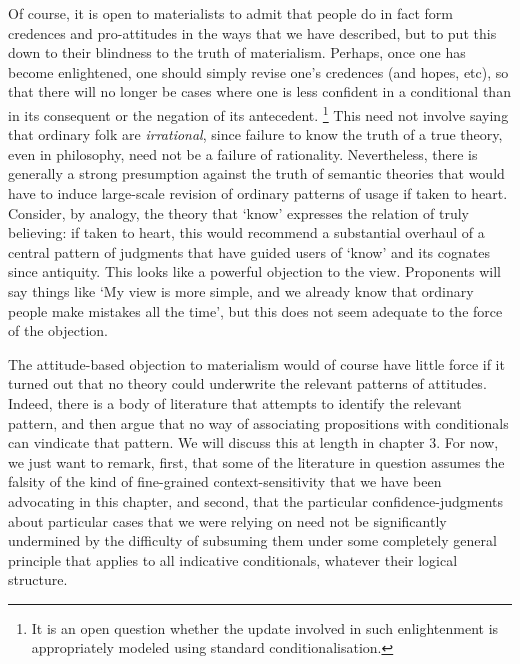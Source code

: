 \documentclass[If.tex]{subfiles}
\begin{document}
Of course, it is open to materialists to admit that people do in fact form credences and pro-attitudes in the ways that we have described, but to put this down to their blindness to the truth of materialism.  Perhaps, once one has become enlightened, one should simply revise one's credences (and hopes, etc), so that there will no longer be cases where one is less confident in a conditional than in its consequent or the negation of its antecedent.%
\footnote{It is an open question whether the update involved in such enlightenment is appropriately modeled using standard conditionalisation.}  
This need not involve saying that ordinary folk are \emph{irrational}, since failure to know the truth of a true theory, even in philosophy, need not be a failure of rationality.  Nevertheless, there is generally a strong presumption against the truth of semantic theories that would have to induce large-scale revision of ordinary patterns of usage if taken to heart.  Consider, by analogy, the theory that ‘know’ expresses the relation of truly believing: if taken to heart, this would recommend a substantial overhaul of a central pattern of judgments that have guided users of ‘know’ and its cognates since antiquity.  This looks like a powerful objection to the view.  Proponents will say things like ‘My view is more simple, and we already know that ordinary people make mistakes all the time’, but this does not seem adequate to the force of the objection.

The attitude-based objection to materialism would of course have little force if it turned out that no theory could underwrite the relevant patterns of attitudes. Indeed, there is a body of literature that attempts to identify the relevant pattern, and then argue that no way of associating propositions with conditionals can vindicate that pattern.  We will discuss this at length in chapter 3.  For now, we just want to remark, first, that some of the literature in question assumes the falsity of the kind of fine-grained context-sensitivity that we have been advocating in this chapter, and second, that the particular confidence-judgments about particular cases that we were relying on need not be significantly undermined by the difficulty of subsuming them under some completely general principle that applies to all indicative conditionals, whatever their logical structure.  


\end{document}
